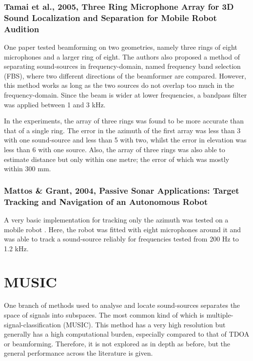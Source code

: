 \documentclass[notitlepage]{report}
\begin{document}
\subsubsection{Tamai et al., 2005, Three Ring Microphone Array for 3D Sound Localization and Separation for Mobile Robot Audition}

One paper \cite{tamai_three_2005} tested beamforming on two geometries, namely three rings of eight microphones and a larger ring of eight. The authors also proposed a method of separating sound-sources in frequency-domain, named frequency band selection (FBS), where two different directions of the beamformer are compared. However, this method works as long as the two sources do not overlap too much in the frequency-domain. Since the beam is wider at lower frequencies, a bandpass filter was applied between 1 and 3 \si{kHz}. 

In the experiments, the array of three rings was found to be more accurate than that of a single ring. The error in the azimuth of the first array was less than 3 \si{\deg} with one sound-source and less than 5 \si{\deg} with two, whilst the error in elevation was less than 6 \si{\deg} with one source. Also, the array of three rings was also able to estimate distance but only within one metre; the error of which was mostly within 300 \si{mm}.

\subsubsection{Mattos \& Grant, 2004, Passive Sonar Applications: Target Tracking and Navigation of an Autonomous Robot}

A very basic implementation for tracking only the azimuth was tested on a mobile robot \cite{mattos_passive_2004}. Here, the robot was fitted with eight microphones around it and was able to track a sound-source reliably for frequencies tested from 200 \si{Hz} to 1.2 \si{kHz}.

\section{MUSIC}

One branch of methods used to analyse and locate sound-sources separates the space of signals into subspaces. The most common kind of which is multiple-signal-classification (MUSIC). This method has a very high resolution but generally has a high computational burden, especially compared to that of TDOA or beamforming. Therefore, it is not explored as in depth as before, but the general performance across the literature is given.
\end{document}

